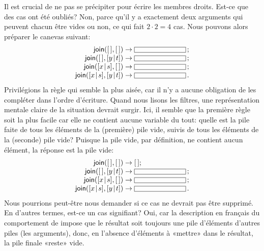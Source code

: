 Il est crucial de ne pas se précipiter pour écrire les membres
droits. Est-ce que des cas ont été oubliés? Non, parce qu'il y a
exactement deux arguments qui peuvent chacun être vides ou non, ce qui
fait \(2 \cdot 2 = 4\) cas. Nous pouvons alors préparer le canevas
suivant:
\begin{equation*}
\begin{array}{r@{\;}l@{\;}l}
\fun{join}(\el,\el) & \rightarrow & \fbcode{CCCCCCCCCC}\,;\\
\fun{join}(\el,\cons{y}{t}) & \rightarrow & \fbcode{CCCCCCCCCC}\,;\\
\fun{join}(\cons{x}{s},\el) & \rightarrow & \fbcode{CCCCCCCCCC}\,;\\
\fun{join}(\cons{x}{s},\cons{y}{t}) & \rightarrow & \fbcode{CCCCCCCCCC}\,.
\end{array}
\end{equation*}
Privilégions la règle qui semble la plus aisée, car il n'y a aucune
obligation de les compléter dans l'ordre d'écriture. Quand nous lisons
les filtres, une représentation mentale claire de la situation devrait
surgir. Ici, il semble que la première règle soit la plus facile car
elle ne contient aucune variable du tout: quelle est la pile faite de
tous les éléments de la (première) pile vide, suivis de tous les
éléments de la (seconde) pile vide? Puisque la pile vide, par
définition, ne contient aucun élément, la réponse est la pile vide:
\begin{equation*}
\begin{array}{r@{\;}l@{\;}l}
\fun{join}(\el,\el) & \rightarrow & \el;\\
\fun{join}(\el,\cons{y}{t}) & \rightarrow & \fbcode{CCCCCCCCCC}\,;\\
\fun{join}(\cons{x}{s},\el) & \rightarrow & \fbcode{CCCCCCCCCC}\,;\\
\fun{join}(\cons{x}{s},\cons{y}{t}) & \rightarrow & \fbcode{CCCCCCCCCC}\,.
\end{array}
\end{equation*}
Nous pourrions peut-être nous demander si ce cas ne devrait pas être
supprimé. En d'autres termes, est-ce un cas signifiant? Oui, car la
description en français du comportement de  impose que le
résultat soit toujours une pile d'éléments d'autres piles (les
arguments), donc, en l'absence d'éléments à «mettre» dans le résultat,
la pile finale «reste» vide.

